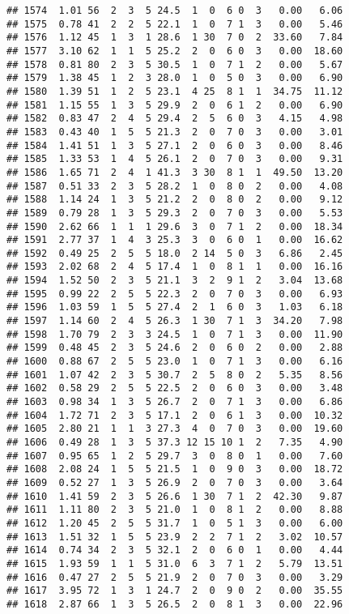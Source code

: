 \documentclass[
]{article}
\begin{document}
\begin{verbatim}
## 1574  1.01 56  2  3  5 24.5  1  0  6 0  3   0.00   6.06
## 1575  0.78 41  2  2  5 22.1  1  0  7 1  3   0.00   5.46
## 1576  1.12 45  1  3  1 28.6  1 30  7 0  2  33.60   7.84
## 1577  3.10 62  1  1  5 25.2  2  0  6 0  3   0.00  18.60
## 1578  0.81 80  2  3  5 30.5  1  0  7 1  2   0.00   5.67
## 1579  1.38 45  1  2  3 28.0  1  0  5 0  3   0.00   6.90
## 1580  1.39 51  1  2  5 23.1  4 25  8 1  1  34.75  11.12
## 1581  1.15 55  1  3  5 29.9  2  0  6 1  2   0.00   6.90
## 1582  0.83 47  2  4  5 29.4  2  5  6 0  3   4.15   4.98
## 1583  0.43 40  1  5  5 21.3  2  0  7 0  3   0.00   3.01
## 1584  1.41 51  1  3  5 27.1  2  0  6 0  3   0.00   8.46
## 1585  1.33 53  1  4  5 26.1  2  0  7 0  3   0.00   9.31
## 1586  1.65 71  2  4  1 41.3  3 30  8 1  1  49.50  13.20
## 1587  0.51 33  2  3  5 28.2  1  0  8 0  2   0.00   4.08
## 1588  1.14 24  1  3  5 21.2  2  0  8 0  2   0.00   9.12
## 1589  0.79 28  1  3  5 29.3  2  0  7 0  3   0.00   5.53
## 1590  2.62 66  1  1  1 29.6  3  0  7 1  2   0.00  18.34
## 1591  2.77 37  1  4  3 25.3  3  0  6 0  1   0.00  16.62
## 1592  0.49 25  2  5  5 18.0  2 14  5 0  3   6.86   2.45
## 1593  2.02 68  2  4  5 17.4  1  0  8 1  1   0.00  16.16
## 1594  1.52 50  2  3  5 21.1  3  2  9 1  2   3.04  13.68
## 1595  0.99 22  2  5  5 22.3  2  0  7 0  3   0.00   6.93
## 1596  1.03 59  1  5  5 27.4  2  1  6 0  3   1.03   6.18
## 1597  1.14 60  2  4  5 26.3  1 30  7 1  3  34.20   7.98
## 1598  1.70 79  2  3  3 24.5  1  0  7 1  3   0.00  11.90
## 1599  0.48 45  2  3  5 24.6  2  0  6 0  2   0.00   2.88
## 1600  0.88 67  2  5  5 23.0  1  0  7 1  3   0.00   6.16
## 1601  1.07 42  2  3  5 30.7  2  5  8 0  2   5.35   8.56
## 1602  0.58 29  2  5  5 22.5  2  0  6 0  3   0.00   3.48
## 1603  0.98 34  1  3  5 26.7  2  0  7 1  3   0.00   6.86
## 1604  1.72 71  2  3  5 17.1  2  0  6 1  3   0.00  10.32
## 1605  2.80 21  1  1  3 27.3  4  0  7 0  3   0.00  19.60
## 1606  0.49 28  1  3  5 37.3 12 15 10 1  2   7.35   4.90
## 1607  0.95 65  1  2  5 29.7  3  0  8 0  1   0.00   7.60
## 1608  2.08 24  1  5  5 21.5  1  0  9 0  3   0.00  18.72
## 1609  0.52 27  1  3  5 26.9  2  0  7 0  3   0.00   3.64
## 1610  1.41 59  2  3  5 26.6  1 30  7 1  2  42.30   9.87
## 1611  1.11 80  2  3  5 21.0  1  0  8 1  2   0.00   8.88
## 1612  1.20 45  2  5  5 31.7  1  0  5 1  3   0.00   6.00
## 1613  1.51 32  1  5  5 23.9  2  2  7 1  2   3.02  10.57
## 1614  0.74 34  2  3  5 32.1  2  0  6 0  1   0.00   4.44
## 1615  1.93 59  1  1  5 31.0  6  3  7 1  2   5.79  13.51
## 1616  0.47 27  2  5  5 21.9  2  0  7 0  3   0.00   3.29
## 1617  3.95 72  1  3  1 24.7  2  0  9 0  2   0.00  35.55
## 1618  2.87 66  1  3  5 26.5  2  0  8 1  3   0.00  22.96

\end{verbatim}
\end{document}
